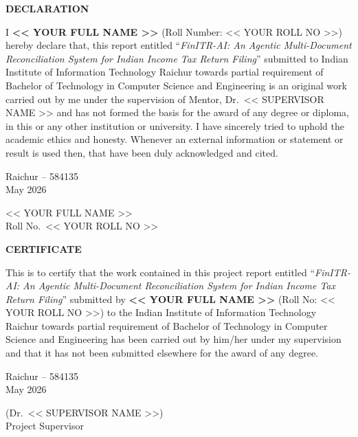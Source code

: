 \documentclass[12pt, a4paper, oneside]{report}
\newcommand{\thesisTitle}{FinITR-AI: An Agentic Multi-Document Reconciliation System for Indian Income Tax Return Filing}
\newcommand{\studentName}{<< YOUR FULL NAME >>}
\newcommand{\rollNumber}{<< YOUR ROLL NO >>}
\newcommand{\supervisorName}{Dr.~<< SUPERVISOR NAME >>}
\newcommand{\departmentName}{Computer Science and Engineering}
\newcommand{\submissionMonthYear}{May 2026}
\newcommand{\submissionLocation}{Raichur -- 584135}
\newcommand{\degreeName}{Bachelor of Technology}
\newcommand{\frontmatterheading}[1]{%
  \begin{center}\Large\bfseries #1\end{center}
  \vspace{0.5cm}
}
\begin{document}
\setcounter{page}{2}

\clearpage
\thispagestyle{plain}
\frontmatterheading{DECLARATION}

\noindent I \textbf{\MakeUppercase{\studentName}} (Roll Number: \rollNumber) hereby
declare that, this report entitled ``\textit{\thesisTitle}'' submitted to
Indian Institute of Information Technology Raichur towards partial requirement
of \degreeName{} in \departmentName{} is an original work carried out by me
under the supervision of Mentor, \supervisorName{} and has not formed the
basis for the award of any degree or diploma, in this or any other institution
or university. I have sincerely tried to uphold the academic ethics and
honesty. Whenever an external information or statement or result is used then,
that have been duly acknowledged and cited.

\vspace{2.5cm}
\noindent
\begin{minipage}[t]{0.5\textwidth}
\submissionLocation \\
\submissionMonthYear
\end{minipage}
\hfill
\begin{minipage}[t]{0.4\textwidth}
\raggedleft
\studentName \\
Roll No.~\rollNumber
\end{minipage}

\clearpage
\thispagestyle{plain}
\frontmatterheading{CERTIFICATE}

\noindent This is to certify that the work contained in this project report
entitled ``\textit{\thesisTitle}'' submitted by \textbf{\studentName} (Roll
No: \rollNumber) to the Indian Institute of Information Technology Raichur
towards partial requirement of \degreeName{} in \departmentName{} has been
carried out by him/her under my supervision and that it has not been submitted
elsewhere for the award of any degree.

\vspace{3cm}
\noindent
\begin{minipage}[t]{0.5\textwidth}
\submissionLocation \\
\submissionMonthYear
\end{minipage}
\hfill
\begin{minipage}[t]{0.4\textwidth}
\raggedleft
(\supervisorName) \\
Project Supervisor
\end{minipage}
\end{document}
